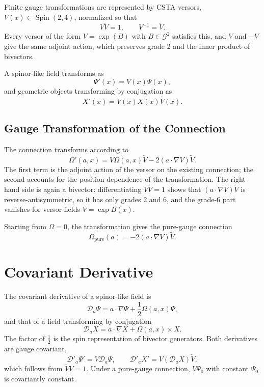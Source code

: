 \documentclass[11pt,a4paper]{article}
\newcommand{\Spin}{\operatorname{Spin}}
\newcommand{\G}{\mathcal{G}}
\newcommand{\D}{\mathcal{D}}
\newcommand{\Om}{\Omega}
\newcommand{\cross}{\mathbin{\times}}
\newcommand{\rev}[1]{\widetilde{#1}}
\begin{document}
Finite gauge transformations are represented by CSTA versors,
\(V(x)\in\Spin(2,4)\), normalized so that
\[
    \boxed{
        V\rev{V}=1,
    }
    \qquad
    V^{-1}=\rev{V}.
\]
Every versor of the form \(V=\exp(B)\) with \(B\in\G^2\) satisfies
this, and \(V\) and \(-V\) give the same adjoint action, which
preserves grade 2 and the inner product of bivectors.

A spinor-like field transforms as
\[
    \Psi'(x)=V(x)\Psi(x),
\]
and geometric objects transforming by conjugation as
\[
    X'(x)=V(x)X(x)\rev{V}(x).
\]

\subsection{Gauge Transformation of the Connection}

The connection transforms according to
\[
    \boxed{
    \Om'(a,x)
    =
    V\Om(a,x)\rev{V}
    -
    2(a\cdot\nabla V)\rev{V}.
    }
\]
The first term is the adjoint action of the versor on the existing
connection; the second accounts for the position dependence of the
transformation. The right-hand side is again a bivector: differentiating
\(V\rev V=1\) shows that \((a\cdot\nabla V)\rev V\) is
reverse-antisymmetric, so it has only grades \(2\) and \(6\), and the
grade-6 part vanishes for versor fields \(V=\exp B(x)\).

Starting from \(\Om=0\), the transformation gives the pure-gauge
connection
\[
    \Om_{\mathrm{pure}}(a)=-2(a\cdot\nabla V)\rev{V}.
\]

\section{Covariant Derivative}

The covariant derivative of a spinor-like field is
\[
    \boxed{
        \D_a\Psi
        =
        a\cdot\nabla\Psi
        +
        \frac{1}{2}\Om(a,x)\Psi,
    }
\]
and that of a field transforming by conjugation
\[
    \D_aX=a\cdot\nabla X+\Om(a,x)\cross X.
\]
The factor of \(\tfrac12\) is the spin representation of bivector
generators. Both derivatives are gauge covariant,
\[
    \boxed{
        \D'_a\Psi'
        =
        V\D_a\Psi,
    }
    \qquad
    \D'_aX'=V(\D_aX)\rev V,
\]
which follows from \(\rev VV=1\). Under a pure-gauge connection,
\(V\Psi_0\) with constant \(\Psi_0\) is covariantly constant.
\end{document}
